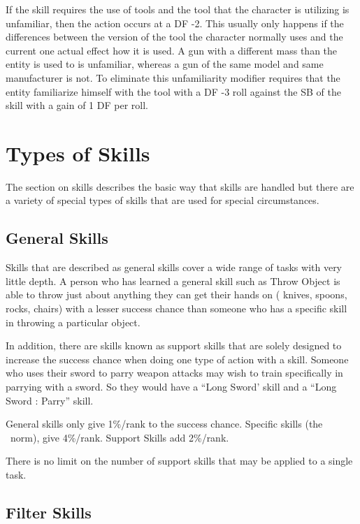 If the skill requires the use of tools and the tool that the character is
utilizing is unfamiliar, then the action occurs at a DF -2. This usually
only happens if the differences between the version of the tool the
character normally uses and the current one actual effect how it is
used. A gun with a different mass than the entity is used to is
unfamiliar, whereas a gun of the same model and same manufacturer is
not. To eliminate this unfamiliarity modifier requires that the entity
familiarize himself with the tool with a DF -3 roll against the SB of 
the skill with a gain of 1 DF per roll. 

\section{Types of Skills}

The section on skills describes the basic way that skills are 
handled but there are a variety of special types of skills that are 
used for special circumstances.

\subsection{General Skills}

Skills that are described as general skills cover a wide range of
tasks with very little depth. A person who has learned a general 
skill such as Throw Object is able to throw just about anything they 
can get their hands on ( knives, spoons, rocks, chairs) with a lesser 
success chance than someone who has a specific skill in throwing a
particular object.

In addition, there are skills known as support skills that are solely
designed to increase the success chance when doing one type of action 
with a skill. Someone who uses their sword to parry weapon attacks 
may wish to train specifically in parrying with a sword. So they 
would have a ``Long Sword' skill and a ``Long Sword : Parry'' skill.

General skills only give 1\%/rank to the success chance. Specific 
skills (the \SH\ norm), give 4\%/rank. Support Skills add 2\%/rank.

There is no limit on the number of support skills that may be applied to
a single task.

\subsection{Filter Skills}

